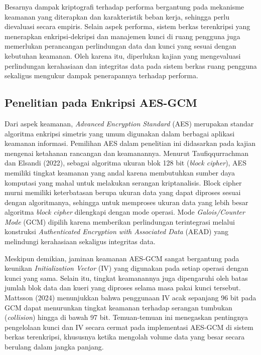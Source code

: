 Besarnya dampak kriptografi terhadap performa bergantung pada mekanisme keamanan yang diterapkan dan karakteristik beban kerja, sehingga perlu dievaluasi secara empiris. Selain aspek performa, sistem berkas terenkripsi yang menerapkan enkripsi-dekripsi dan manajemen kunci di ruang pengguna juga memerlukan perancangan perlindungan data dan kunci yang sesuai dengan kebutuhan keamanan. Oleh karena itu, diperlukan kajian yang mengevaluasi perlindungan kerahasiaan dan integritas data pada sistem berkas ruang pengguna sekaligus mengukur dampak penerapannya terhadap performa.

\subsection{Penelitian pada Enkripsi AES-GCM}
Dari aspek keamanan, \textit{Advanced Encryption Standard} (AES) merupakan standar algoritma enkripsi simetris yang umum digunakan dalam berbagai aplikasi keamanan informasi. Pemilihan AES dalam penelitian ini didasarkan pada kajian mengenai ketahanan rancangan dan keamanannya\cite{Rahma2022Proposed,Spoorthy2025Design,Taufiqqurrachman2022Security}. Menurut Taufiqqurrachman dan Elsandi (2022)\cite{Taufiqqurrachman2022Security}, sebagai algoritma ukuran blok 128 bit (\textit{block cipher}), AES memiliki tingkat keamanan yang andal karena membutuhkan sumber daya komputasi yang mahal untuk melakukan serangan kriptanalisis. Block cipher murni memiliki keterbatasan berupa ukuran data yang dapat diproses sesuai dengan algoritmanya, sehingga untuk memproses ukuran data yang lebih besar algoritma \textit{block cipher} dilengkapi dengan mode operasi. Mode \textit{Galois/Counter Mode} (GCM) dipilih karena memberikan perlindungan terintegrasi melalui konstruksi \textit{Authenticated Encryption with Associated Data} (AEAD) yang melindungi kerahasiaan sekaligus integritas data\cite{Anh2026Refining,Fischlin2026QuantumResistant}. 

Meskipun demikian, jaminan keamanan AES-GCM sangat bergantung pada keunikan \textit{Initialization Vector} (IV) yang digunakan pada setiap operasi dengan kunci yang sama\cite{Chung2025Making}. Selain itu, tingkat keamanannya juga dipengaruhi oleh batas jumlah blok data dan kueri yang diproses selama masa pakai kunci tersebut\cite{Anh2026Refining}. Mattsson (2024)\cite{Mattsson2024Collision} menunjukkan bahwa penggunaan IV acak sepanjang 96 bit pada GCM dapat menurunkan tingkat keamanan terhadap serangan tumbukan (\textit{collision}) hingga di bawah 97 bit. Temuan-temuan ini menegaskan pentingnya pengelolaan kunci dan IV secara cermat pada implementasi AES-GCM di sistem berkas terenkripsi, khususnya ketika mengolah volume data yang besar secara berulang dalam jangka panjang.
 
